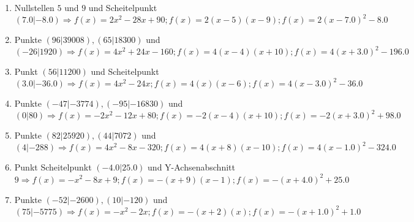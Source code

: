 \documentclass{article}%
\begin{document}
\begin{enumerate}[label=\alph*)]
\item%
 Nullstellen $5$ und $9$ und Scheitelpunkt $(7.0|-8.0) \Rightarrow f(x)=2x^2 - 28x + 90 ; f(x)=2(x-5)(x-9) ; f(x)=2(x-7.0)^2 -8.0$%
\item%
 Punkte $(96|39008),(65|18300)$ und $(-26|1920) \Rightarrow f(x)=4x^2 + 24x - 160 ; f(x)=4(x-4)(x+10) ; f(x)=4(x+3.0)^2 -196.0$%
\item%
 Punkt $(56|11200)$ und Scheitelpunkt $(3.0|-36.0) \Rightarrow f(x)=4x^2 - 24x ; f(x)=4(x)(x-6) ; f(x)=4(x-3.0)^2 -36.0$%
\item%
 Punkte $(-47|-3774),(-95|-16830)$ und $(0|80) \Rightarrow f(x)=-2x^2 - 12x + 80 ; f(x)=-2(x-4)(x+10) ; f(x)=-2(x+3.0)^2 +98.0$%
\item%
 Punkte $(82|25920),(44|7072)$ und $(4|-288) \Rightarrow f(x)=4x^2 - 8x - 320 ; f(x)=4(x+8)(x-10) ; f(x)=4(x-1.0)^2 -324.0$%
\item%
 Punkt Scheitelpunkt $(-4.0|25.0)$ und Y-Achsenabschnitt $9 \Rightarrow f(x)=-x^2 - 8x + 9 ; f(x)=-(x+9)(x-1) ; f(x)=-(x+4.0)^2 +25.0$%
\item%
 Punkte $(-52|-2600),(10|-120)$ und $(75|-5775) \Rightarrow f(x)=-x^2 - 2x ; f(x)=-(x+2)(x) ; f(x)=-(x+1.0)^2 +1.0$%
\end{enumerate}

%
\end{document}
